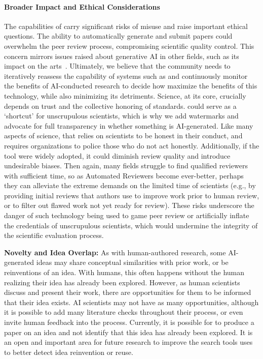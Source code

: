 \begin{appendices}
\paragraph{Broader Impact and Ethical Considerations}
The capabilities of \ouralgo carry significant risks of misuse and raise important ethical questions. The ability to automatically generate and submit papers could overwhelm the peer review process, compromising scientific quality control. This concern mirrors issues raised about generative AI in other fields, such as its impact on the arts~\citep{epstein2023art}. Ultimately, we believe that the community needs to iteratively reassess the capability of systems such as \ouralgo and continuously monitor the benefits of AI-conducted research to decide how maximize the benefits of this technology, while also minimizing its detriments. Science, at its core, crucially depends on trust and the collective honoring of standards. \ouralgo could serve as a `shortcut' for unscrupulous scientists, which is why we add watermarks and advocate for full transparency in whether something is AI-generated. Like many aspects of science, that relies on scientists to be honest in their conduct, and requires organizations to police those who do not act honestly. Additionally, if the \ourreviewer tool were widely adopted, it could diminish review quality and introduce undesirable biases. Then again, many fields struggle to find qualified reviewers with sufficient time, so as Automated Reviewers become ever-better, perhaps they can alleviate the extreme demands on the limited time of scientists (e.g., by providing initial reviews that authors use to improve work prior to human review, or to filter out flawed work not yet ready for review). These risks underscore the danger of such technology being used to game peer review or artificially inflate the credentials of unscrupulous scientists, which would undermine the integrity of the scientific evaluation process.

\textbf{Novelty and Idea Overlap:}
As with human-authored research, some AI-generated ideas may share conceptual similarities with prior work, or be reinventions of an idea. With humans, this often happens without the human realizing their idea has already been explored. However, as human scientists discuss and present their work, there are opportunities for them to be informed that their idea exists. AI scientists may not have as many opportunities, although it is possible to add many literature checks throughout their process, or even invite human feedback into the process. Currently, it is possible for \ouralgo to produce a paper on an idea and not identify that this idea has already been explored. It is an open and important area for future research to improve the search tools \ouralgo uses to better detect idea reinvention or reuse.


\end{appendices}
